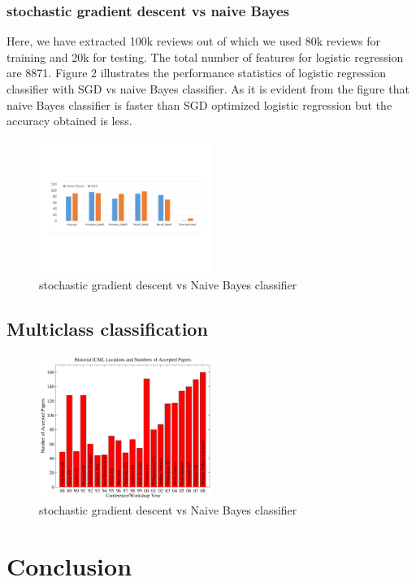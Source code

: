 \documentclass{article}
\begin{document}
\subsubsection{stochastic gradient descent vs naive Bayes}
Here, we have extracted 100k reviews out of which we used 80k reviews for training and 20k for testing. The total number of features for logistic regression are 8871. Figure 2 illustrates the performance statistics of logistic regression classifier with SGD vs naive Bayes classifier.  As it is evident from the figure that naive Bayes classifier is faster than SGD optimized logistic regression but the accuracy obtained is less.
\begin{figure}[H]
  \caption{stochastic gradient descent vs Naive Bayes classifier}
  \centering
    \includegraphics[width=0.5\textwidth]{sgdvsbayes}
\end{figure}



\subsection{Multiclass classification}
\begin{figure}[H]
  \caption{stochastic gradient descent vs Naive Bayes classifier}
  \centering
    \includegraphics[width=0.5\textwidth]{icml_numpapers}
\end{figure}




\section{Conclusion}


\nocite{langley00}



\end{document}
